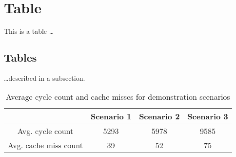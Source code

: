 \chapter{Table}

This is a table \ldots

\section{Tables}

\ldots described in a subsection.

\begin{table}[H]
\begin{center}
\begin{tabular}{|c|c|c|c|}
\cline{2-4}
\multicolumn{0}{c|}{} & Scenario 1 & Scenario 2 & Scenario 3 \\ \hline
Avg. cycle count & 5293 & 5978 & 9585 \\ \hline
Avg. cache miss count & 39 & 52 & 75 \\ \hline
\end{tabular}
\end{center}
\caption{Average cycle count and cache misses for demonstration scenarios}
\end{table}


